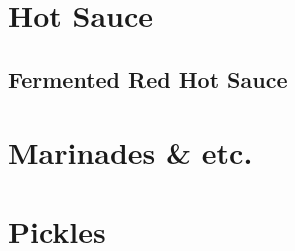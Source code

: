 \chapter{Hot Sauce}
\minitoc
\clearpage
{

	\section[Red Hot Sauce]{Fermented Red Hot Sauce}
	\let\section\subsection
	\let\subsection\subsubsection
	
	
}

\chapter{Marinades \& etc.}
\minitoc
\clearpage





\chapter{Pickles}
\minitoc
\clearpage

{
	\let\section\subsection
	\let\subsection\subsubsection
	
	
	
}

